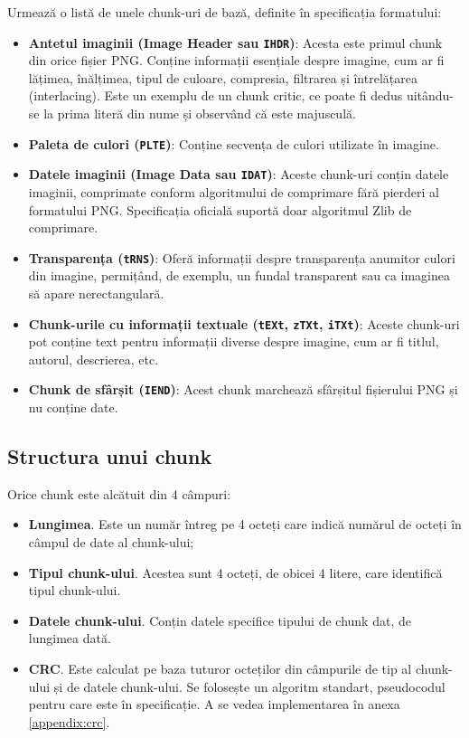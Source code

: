 \documentclass[a4paper,12pt]{report}
\begin{document}
Urmează o listă de unele chunk-uri de bază, definite în specificația formatului:
\begin{itemize}
  \item
      \textbf{Antetul imaginii (Image Header sau \texttt{IHDR})}:
      Acesta este primul chunk din orice fișier \ac{PNG}.
      Conține informații esențiale despre imagine, cum ar fi lățimea,
      înălțimea, tipul de culoare, compresia, filtrarea și întrelățarea (interlacing).
      Este un exemplu de un chunk critic, ce poate fi dedus uitându-se
      la prima literă din nume și observând că este majusculă.

  \item
      \textbf{Paleta de culori (\texttt{PLTE})}:
      Conține secvența de culori utilizate în imagine.

  \item
      \textbf{Datele imaginii (Image Data sau \texttt{IDAT})}:
      Aceste chunk-uri conțin datele imaginii,
      comprimate conform algoritmului de comprimare fără pierderi al formatului \ac{PNG}.
      Specificația oficială suportă doar algoritmul Zlib de comprimare.

  \item
      \textbf{Transparența (\texttt{tRNS})}:
      Oferă informații despre transparența anumitor culori din imagine,
      permițând, de exemplu, un fundal transparent sau ca imaginea să apare nerectangulară.

  \item
      \textbf{Chunk-urile cu informații textuale (\texttt{tEXt}, \texttt{zTXt}, \texttt{iTXt})}:
      Aceste chunk-uri pot conține text pentru informații diverse despre imagine,
        cum ar fi titlul, autorul, descrierea, etc.

  \item
      \textbf{Chunk de sfârșit (\texttt{IEND})}:
      Acest chunk marchează sfârșitul fișierului \ac{PNG} și nu conține date.
\end{itemize}

\subsection{Structura unui chunk}

Orice chunk este alcătuit din 4 câmpuri:
\begin{itemize}
    \item \textbf{Lungimea}. Este un număr întreg pe 4 octeți care indică numărul de octeți în câmpul de date al chunk-ului;
    \item \textbf{Tipul chunk-ului}. Acestea sunt 4 octeți, de obicei 4 litere, care identifică tipul chunk-ului.
    \item \textbf{Datele chunk-ului}. Conțin datele specifice tipului de chunk dat, de lungimea dată.
    \item \textbf{\ac{CRC}}.
        Este calculat pe baza tuturor octeților din câmpurile de tip al chunk-ului și de datele chunk-ului. 
        Se folosește un algoritm standart, pseudocodul pentru care este în specificație.
        A se vedea implementarea în anexa \ref{appendix:crc}.
\end{itemize}
\end{document}

